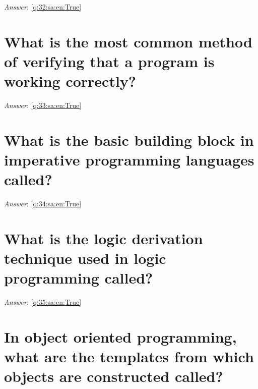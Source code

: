 \documentclass[a4paper,11pt,oneside]{book}
\begin{document}
\begin{sloppypar}
\vspace{1cm}

\textit{Answer}: \autoref{q:32:sa:en:True}



\section{What is the most common method of verifying that a program is working correctly?}

\label{q:33:sa:en:False}

\vspace{2cm}

\noindent\makebox[\textwidth]{\hrulefill}

\vspace{1cm}

\textit{Answer}: \autoref{q:33:sa:en:True}



\section{What is the basic building block in imperative programming languages called?}

\label{q:34:sa:en:False}

\vspace{2cm}

\noindent\makebox[\textwidth]{\hrulefill}

\vspace{1cm}

\textit{Answer}: \autoref{q:34:sa:en:True}



\section{What is the logic derivation technique used in logic programming called?}

\label{q:35:sa:en:False}

\vspace{2cm}

\noindent\makebox[\textwidth]{\hrulefill}

\vspace{1cm}

\textit{Answer}: \autoref{q:35:sa:en:True}



\section{In object oriented programming, what are the templates from which objects are constructed called?}


\end{sloppypar}
\end{document}

